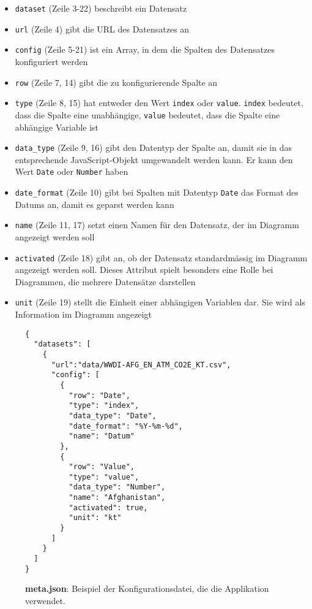 \begin{itemize}
	\item \texttt{dataset} (Zeile 3-22) beschreibt ein Datensatz
	\item \texttt{url} (Zeile 4) gibt die URL des Datensatzes an
	\item \texttt{config} (Zeile 5-21) ist ein Array, in dem die Spalten des Datensatzes konfiguriert werden
	\item \texttt{row} (Zeile 7, 14) gibt die zu konfigurierende Spalte an
	\item \texttt{type} (Zeile 8, 15) hat entweder den Wert \texttt{index} oder \texttt{value}. \texttt{index} bedeutet, dass die Spalte eine unabhängige, \texttt{value} bedeutet, dass die Spalte eine abhängige Variable ist
	\item \texttt{data\_type} (Zeile 9, 16) gibt den Datentyp der Spalte an, damit sie in das entsprechende JavaScript-Objekt umgewandelt werden kann. Er kann den Wert \texttt{Date} oder \texttt{Number} haben
	\item \texttt{date\_format} (Zeile 10) gibt bei Spalten mit Datentyp \texttt{Date} das Format des Datums an, damit es geparst werden kann
	\item \texttt{name} (Zeile 11, 17) setzt einen Namen für den Datensatz, der im Diagramm angezeigt werden soll
	\item \texttt{activated} (Zeile 18) gibt an, ob der Datensatz standardmässig im Diagramm angezeigt werden soll. Dieses Attribut spielt besonders eine Rolle bei Diagrammen, die mehrere Datensätze darstellen
	\item \texttt{unit} (Zeile 19) stellt die Einheit einer abhängigen Variablen dar. Sie wird als Information im Diagramm angezeigt
\end{itemize}

\begin{figure}[!htbp]
	\centering
	\begin{verbatim}
{
  "datasets": [
    {
      "url":"data/WWDI-AFG_EN_ATM_CO2E_KT.csv",
      "config": [
        {
          "row": "Date",
          "type": "index",
          "data_type": "Date",
          "date_format": "%Y-%m-%d",
          "name": "Datum"
        },
        {
          "row": "Value",
          "type": "value",
          "data_type": "Number",
          "name": "Afghanistan",
          "activated": true,
          "unit": "kt"
        }
      ]
    }
  ]	
}
	\end{verbatim}
	
	
	\caption[Beispiel der Konfigurationsdatei: meta.json]{\textbf{meta.json}: Beispiel der Konfigurationsdatei, die die Applikation verwendet.}
	\label{fig:meta}
\end{figure}

